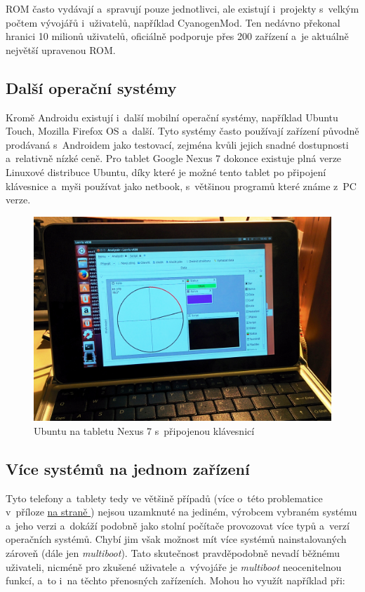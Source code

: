 \documentclass[12pt, a4paper, oneside]{article}
\newcommand{\It}{\textit}  %
\newcommand*{\attref}[1]{\hyperref[{#1}]{\uv{\nameref*{#1}} na straně \pageref{#1}}}
\begin{document}
ROM často vydávají a~spravují pouze jednotlivci, ale existují i~projekty s~velkým počtem vývojářů i~uživatelů, například CyanogenMod\cite{CM}. Ten nedávno překonal hranici 10 milionů uživatelů, oficiálně podporuje přes 200 zařízení a~je aktuálně největší upravenou ROM.

\subsection{Další operační systémy}
Kromě Androidu existují i~další mobilní operační systémy, například Ubuntu Touch\cite{utouch}, Mozilla Firefox OS\cite{firefoxos} a~další. Tyto systémy často používají zařízení původně prodávaná s~Androidem jako testovací, zejména kvůli jejich snadné dostupnosti a~relativně nízké ceně. Pro tablet Google Nexus 7 dokonce existuje plná verze Linuxové distribuce Ubuntu, díky které je možné tento tablet po připojení klávesnice a~myši používat jako netbook, s~většinou programů které známe z~PC verze.

\begin{figure}[H]
\begin{center}
\includegraphics[width=\textwidth]{img/n7_ubuntu.jpg}
\caption{Ubuntu na tabletu Nexus 7 s~připojenou klávesnicí}
\end{center}
\end{figure}

\subsection{Více systémů na jednom zařízení}
Tyto telefony a~tablety tedy ve většině případů (více o~této problematice v~příloze \attref{sec:locked}) nejsou uzamknuté na jediném, výrobcem vybraném systému a~jeho verzi a~dokáží podobně jako stolní počítače provozovat více typů a~verzí operačních systémů. Chybí jim však možnost mít více systémů nainstalovaných zároveň (dále jen \It{multiboot}). Tato skutečnost pravděpodobně nevadí běžnému uživateli, nicméně pro zkušené uživatele a~vývojáře je \It{multiboot} neocenitelnou funkcí, a~to i~na těchto přenosných zařízeních. Mohou ho využít například při:
\end{document}
